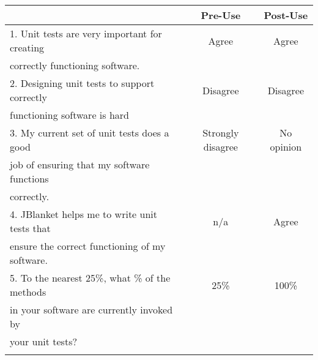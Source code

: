 \begin{tabular}{lcc} \\
 & {\bf Pre-Use} & {\bf Post-Use} \\ \hline
1. Unit tests are very important for creating & Agree & Agree \\
   correctly functioning software. \\ \hline

2. Designing unit tests to support correctly & Disagree & Disagree \\
   functioning software is hard\\ \hline

3. My current set of unit tests does a good & Strongly disagree & No opinion \\
   job of ensuring that my software functions \\
   correctly.\\ \hline

4. JBlanket helps me to write unit tests that & n/a & Agree \\
   ensure the correct functioning of my software.\\ \hline

5. To the nearest 25\%, what \% of the methods & 25\% & 100\% \\
   in your software are currently invoked by \\
   your unit tests?\\ \hline
\\
\end{tabular}

